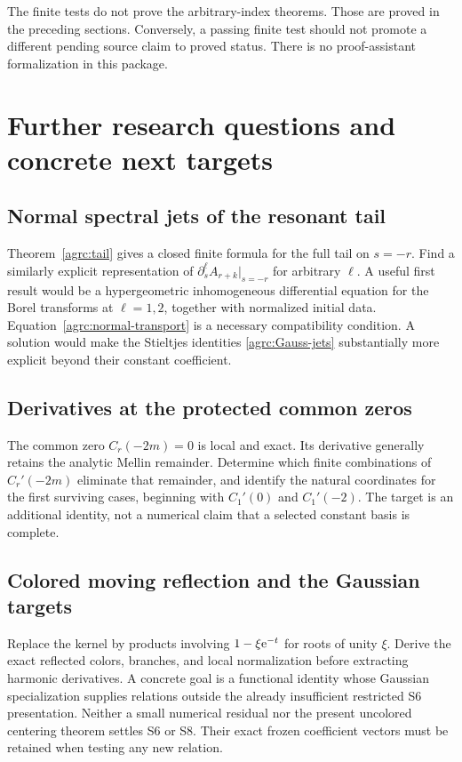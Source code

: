 The finite tests do not prove the arbitrary-index theorems. Those are
proved in the preceding sections. Conversely, a passing finite test
should not promote a different pending source claim to proved status.
There is no proof-assistant formalization in this package.

\section{Further research questions and concrete next targets}
\label{agrc:future}

\subsection{Normal spectral jets of the resonant tail}
Theorem~\ref{agrc:tail} gives a closed finite formula for the full tail
on $s=-r$. Find a similarly explicit representation of
$\partial_s^\ell A_{r+k}|_{s=-r}$ for arbitrary $\ell$. A useful first
result would be a hypergeometric inhomogeneous differential equation
for the Borel transforms at $\ell=1,2$, together with normalized initial
data. Equation~\eqref{agrc:normal-transport} is a necessary compatibility
condition. A solution would make the Stieltjes identities
\eqref{agrc:Gauss-jets} substantially more explicit beyond their
constant coefficient.

\subsection{Derivatives at the protected common zeros}
The common zero $C_r(-2m)=0$ is local and exact. Its derivative generally
retains the analytic Mellin remainder. Determine which finite combinations
of $C_r'(-2m)$ eliminate that remainder, and identify the natural
coordinates for the first surviving cases, beginning with $C_1'(0)$
and $C_1'(-2)$. The target is an additional identity, not a numerical
claim that a selected constant basis is complete.

\subsection{Colored moving reflection and the Gaussian targets}
Replace the kernel by products involving $1-\xi\mathrm e^{-t}$ for roots of
unity $\xi$. Derive the exact reflected colors, branches, and local
normalization before extracting harmonic derivatives. A concrete goal
is a functional identity whose Gaussian specialization supplies relations
outside the already insufficient restricted S6 presentation. Neither a
small numerical residual nor the present uncolored centering theorem
settles S6 or S8. Their exact frozen coefficient vectors must be retained
when testing any new relation.

